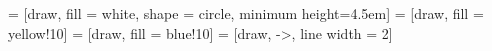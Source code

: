 \usetikzlibrary{shapes,arrows,decorations.pathreplacing, calc, intersections}
\makeatletter
\newcommand{\gettikzxy}[3]{%
  \tikz@scan@one@point\pgfutil@firstofone#1\relax
  \edef#2{\the\pgf@x}%
  \edef#3{\the\pgf@y}%
}
\makeatother






\def\clscellsize{4.5}
\def\blockdist{2.3}
\def\edgedist{2.5}
\def\clsdist{.1}
\def\varmargin{.25}
\def\timemargin{.25}



\def\clsgrpdist{\clscellsize * .1}
\def\vargrpdist{\clscellsize * .4}
\def\timegrpdist{\clscellsize * 1.5}




 = [draw, fill = white, shape = circle, minimum height=\clscellsize em]
 = [draw, fill = yellow!10]
 = [draw, fill = blue!10]
 = [draw, ->, line width = 2]

